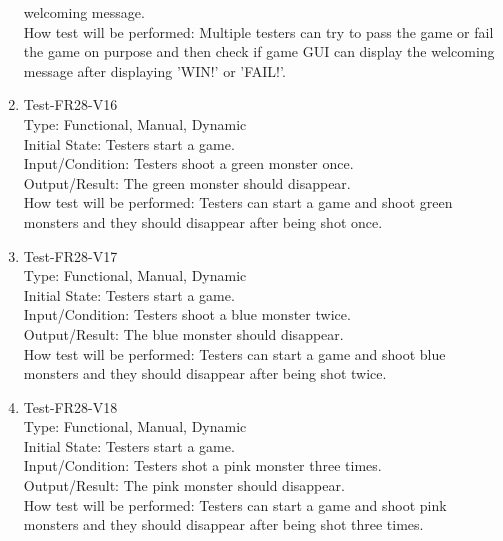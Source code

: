 \documentclass[12pt]{article}
\begin{document}
\begin{enumerate}[1.]
{{welcoming message.\\
How test will be performed: Multiple testers can try 
to pass the game or fail the game on purpose and then
check if game GUI can display the welcoming message after
displaying 'WIN!' or 'FAIL!'.}}
\item Test-FR28-V16\\
Type: Functional, Manual, Dynamic\\
Initial State: Testers start a game.\\
Input/Condition: Testers shoot a green monster once.\\
Output/Result: The green monster should disappear.\\
How test will be performed: Testers can start a game and
shoot green monsters and they should disappear after
being shot once.
\item Test-FR28-V17\\
Type: Functional, Manual, Dynamic\\
Initial State: Testers start a game.\\
Input/Condition: Testers shoot a blue monster twice.\\
Output/Result: The blue monster should disappear.\\
How test will be performed: Testers can start a game and
shoot blue monsters and they should disappear after
being shot twice.
\item Test-FR28-V18\\
Type: Functional, Manual, Dynamic\\
Initial State: Testers start a game.\\
Input/Condition: Testers shot a pink monster three times.\\
Output/Result: The pink monster should disappear.\\
How test will be performed: Testers can start a game and
shoot pink monsters and they should disappear after
being shot three times.
\end{enumerate}
\end{document}
